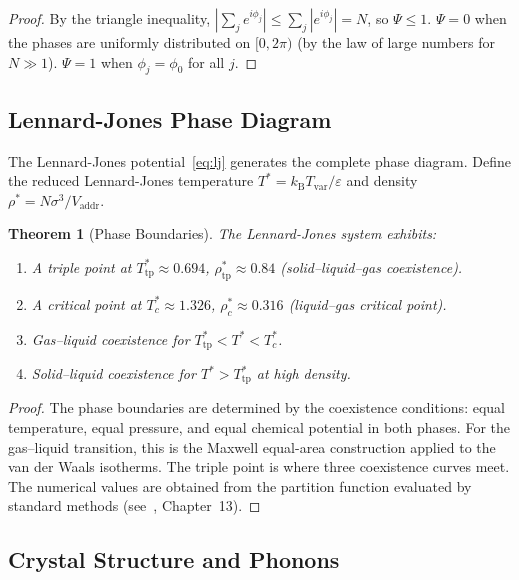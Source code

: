 \documentclass[11pt,twocolumn,a4paper]{article}
\newtheorem{theorem}{Theorem}[section]
\theoremstyle{definition}
\theoremstyle{remark}
\newcommand{\kB}{k_{\mathrm{B}}}
\newcommand{\Tvar}{T_{\mathrm{var}}}
\newcommand{\Vaddr}{V_{\mathrm{addr}}}
\begin{document}
\begin{proof}
By the triangle inequality,
$|\sum_j e^{i\phi_j}|\leq\sum_j|e^{i\phi_j}|=N$, so $\Psi\leq 1$.
$\Psi=0$ when the phases are uniformly distributed on $[0,2\pi)$ (by the
law of large numbers for $N\gg 1$).  $\Psi=1$ when $\phi_j=\phi_0$ for
all $j$.
\end{proof}

\subsection{Lennard-Jones Phase Diagram}\label{sec:lj_phase}

The Lennard-Jones potential~\eqref{eq:lj} generates the complete phase
diagram.  Define the reduced Lennard-Jones temperature
$T^{*}=\kB\Tvar/\varepsilon$ and density $\rho^{*}=N\sigma^3/\Vaddr$.

\begin{theorem}[Phase Boundaries]\label{thm:phase_boundaries}
The Lennard-Jones system exhibits:
\begin{enumerate}[label=(\alph*)]
  \item A \emph{triple point} at $T^{*}_{\mathrm{tp}}\approx 0.694$,
        $\rho^{*}_{\mathrm{tp}}\approx 0.84$ (solid--liquid--gas
        coexistence).
  \item A \emph{critical point} at $T^{*}_c\approx 1.326$,
        $\rho^{*}_c\approx 0.316$ (liquid--gas critical point).
  \item \emph{Gas--liquid coexistence} for
        $T^{*}_{\mathrm{tp}}<T^{*}<T^{*}_c$.
  \item \emph{Solid--liquid coexistence} for $T^{*}>T^{*}_{\mathrm{tp}}$
        at high density.
\end{enumerate}
\end{theorem}

\begin{proof}
The phase boundaries are determined by the coexistence conditions: equal
temperature, equal pressure, and equal chemical potential in both phases.
For the gas--liquid transition, this is the Maxwell equal-area construction
applied to the van der Waals isotherms.  The triple point is where three
coexistence curves meet.  The numerical values are obtained from the
partition function evaluated by standard methods (see~\cite{Pathria2011},
Chapter~13).
\end{proof}

\subsection{Crystal Structure and Phonons}\label{sec:phonons}
\end{document}
